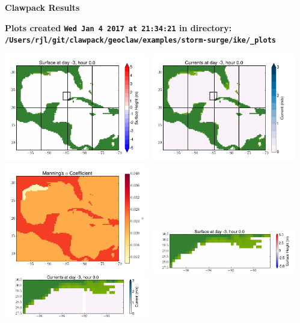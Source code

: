 \documentclass[11pt]{article}
\begin{document}
        \begin{center}{\Large\bf Clawpack Results}\vskip 5pt
        
        \bf Plots created {\tt Wed Jan  4 2017 at 21:34:21} in directory: \vskip 5pt
        \verb+/Users/rjl/git/clawpack/geoclaw/examples/storm-surge/ike/_plots+
        \end{center}
        \vskip 5pt
        \includegraphics[width=0.475\textwidth]{frame0000fig1.png}
\includegraphics[width=0.475\textwidth]{frame0000fig2.png}
\vskip 10pt 
\includegraphics[width=0.475\textwidth]{frame0000fig3.png}
\includegraphics[width=0.475\textwidth]{frame0000fig4.png}
\vskip 10pt 
\includegraphics[width=0.475\textwidth]{frame0000fig5.png}
\end{document}
